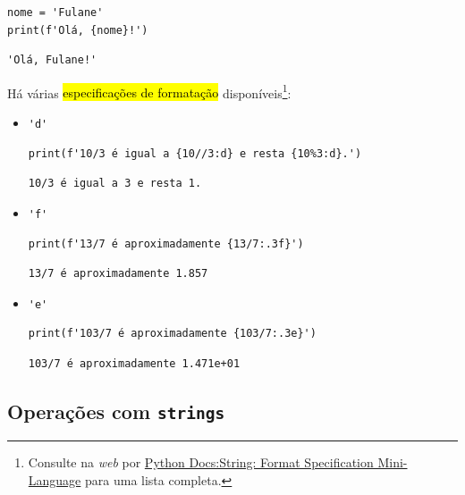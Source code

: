 \begin{lstlisting}
nome = 'Fulane'
print(f'Olá, {nome}!')
\end{lstlisting}

\begin{verbatim}
'Olá, Fulane!'
\end{verbatim}

Há várias \hl{especificações de formatação} disponíveis\footnote{Consulte na \textit{web} por \href{https://docs.python.org/3/library/string.html\#format-specification-mini-language}{Python Docs:String: Format Specification Mini-Language} para uma lista completa.}:
\begin{itemize}
\item \lstinline+'d'+ 

\begin{lstlisting}[xrightmargin=2.5em]
print(f'10/3 é igual a {10//3:d} e resta {10%3:d}.')
\end{lstlisting}

\begin{verbatim}
10/3 é igual a 3 e resta 1.
\end{verbatim}

\item \lstinline+'f'+ 

\begin{lstlisting}[xrightmargin=2.5em]
print(f'13/7 é aproximadamente {13/7:.3f}')
\end{lstlisting}

\begin{verbatim}
13/7 é aproximadamente 1.857
\end{verbatim}

\item \lstinline+'e'+ 

\begin{lstlisting}[xrightmargin=2.5em]
print(f'103/7 é aproximadamente {103/7:.3e}')
\end{lstlisting}  

\begin{verbatim}
103/7 é aproximadamente 1.471e+01
\end{verbatim}

\end{itemize}

\subsection{Operações com \texttt{strings}}

